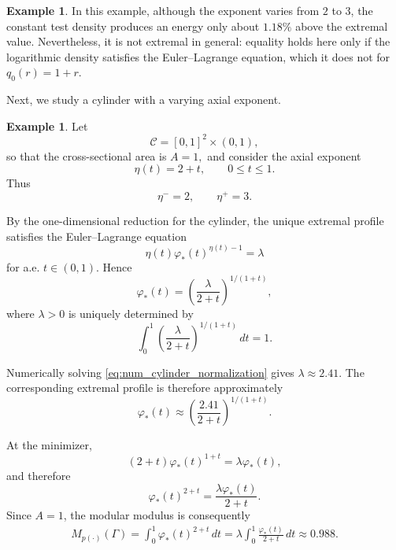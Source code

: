 \documentclass[12pt]{amsart}
\numberwithin{equation}{section}
\theoremstyle{plain}
\theoremstyle{definition}
\newtheorem{example}[equation]{Example}
\begin{document}
\begin{example}
In this example, although the exponent varies from $2$ to $3$, the constant test density produces an energy only about $1.18\%$ above the extremal value.  Nevertheless, it is not extremal in general: equality holds here only if the logarithmic density satisfies the Euler--Lagrange equation, which it does not for $q_0(r)=1+r$.
\end{example}

Next, we study a cylinder with a varying axial exponent.
\begin{example}
\label{ex:comp_cylinder}
\rm
Let
\begin{equation*}
\mathcal C=[0,1]^2\times(0,1),
\end{equation*}
so that the cross-sectional area is $A=1,$ and consider the axial exponent
\begin{equation*}
\eta(t)=2+t, \qquad 0\le t\le1.
\end{equation*}
Thus
\begin{equation*}
\eta^-=2, \qquad \eta^+=3.
\end{equation*}

By the one-dimensional reduction for the cylinder, the unique extremal profile satisfies the Euler--Lagrange equation
\begin{equation*}
\eta(t)\varphi_*(t)^{\eta(t)-1} = \lambda
\end{equation*}
for a.e. $t\in(0,1)$. Hence
\begin{equation*}
\varphi_*(t) = \left( \frac{\lambda}{2+t} \right)^{1/(1+t)},
\end{equation*}
where $\lambda>0$ is uniquely determined by
\begin{equation}
\label{eq:num_cylinder_normalization}
\int_0^1 \left( \frac{\lambda}{2+t} \right)^{1/(1+t)} \,dt =1.
\end{equation}

Numerically solving \eqref{eq:num_cylinder_normalization} gives $\lambda\approx 2.41$. The corresponding extremal profile is therefore approximately
\begin{equation*}
\varphi_*(t) \approx \left( \frac{2.41}{2+t} \right)^{1/(1+t)}.
\end{equation*}

At the minimizer,
\begin{equation*}
(2+t)\varphi_*(t)^{1+t} = \lambda\varphi_*(t),
\end{equation*}
and therefore
\begin{equation*}
\varphi_*(t)^{2+t} = \frac{\lambda\varphi_*(t)}{2+t}.
\end{equation*}
Since $A=1$, the modular modulus is consequently
\begin{align*}
M_{p(\cdot)}(\Gamma) = \int_0^1 \varphi_*(t)^{2+t}\,dt = \lambda \int_0^1 \frac{\varphi_*(t)}{2+t}\,dt \approx 0.988.
\end{align*}


\end{example}
\end{document}
